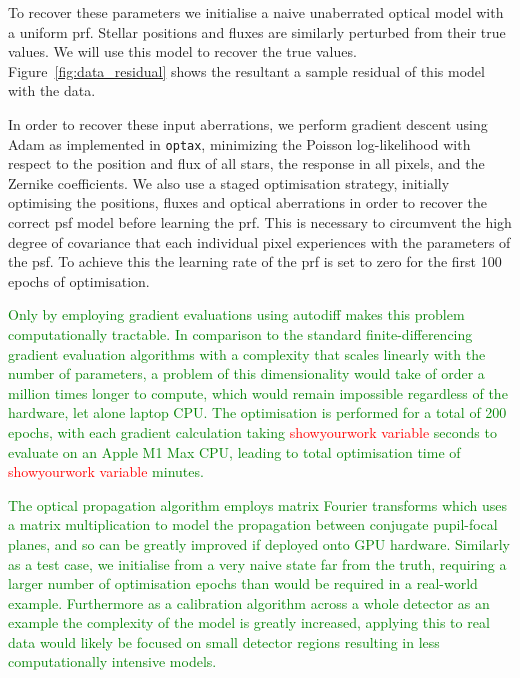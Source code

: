 \documentclass[twocolumn]{spie}
\newcommand\optax{\texttt{optax}\xspace}
\begin{document}
To recover these parameters we initialise a naive unaberrated optical model with a uniform \ac{prf}. Stellar positions and fluxes are similarly perturbed from their true values. We will use this model to recover the true values. Figure~\ref{fig:data_residual} shows the resultant a sample residual of this model with the data. 

In order to recover these input aberrations, we perform gradient descent using Adam \cite{Kingma2014} as implemented in \optax \cite{optax2020github}, minimizing the Poisson log-likelihood with respect to the position and flux of all stars, the response in all pixels, and the Zernike coefficients. We also use a staged optimisation strategy, initially optimising the positions, fluxes and optical aberrations in order to recover the correct \ac{psf} model before learning the \ac{prf}. This is necessary to circumvent the high degree of covariance that each individual pixel experiences with the parameters of the \ac{psf}. To achieve this the learning rate of the \ac{prf} is set to zero for the first 100 epochs of optimisation.

\textcolor{green}{Only by employing gradient evaluations using autodiff makes this problem computationally tractable. In comparison to the standard finite-differencing gradient evaluation algorithms with a complexity that scales linearly with the number of parameters, a problem of this dimensionality would take of order a million times longer to compute, which would remain impossible regardless of the hardware, let alone laptop CPU. The optimisation is performed for a total of 200 epochs, with each gradient calculation taking \textcolor{red}{showyourwork variable} seconds to evaluate on an Apple M1 Max CPU, leading to total optimisation time of \textcolor{red}{showyourwork variable} minutes.}

\textcolor{green}{The optical propagation algorithm employs matrix Fourier transforms which uses a matrix multiplication to model the propagation between conjugate pupil-focal planes, and so can be greatly improved if deployed onto GPU hardware. Similarly as a test case, we initialise from a very naive state far from the truth, requiring a larger number of optimisation epochs than would be required in a real-world example. Furthermore as a calibration algorithm across a whole detector as an example the complexity of the model is greatly increased, applying this to real data would likely be focused on small detector regions resulting in less computationally intensive models.}
\end{document}
